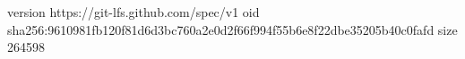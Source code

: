 version https://git-lfs.github.com/spec/v1
oid sha256:9610981fb120f81d6d3bc760a2e0d2f66f994f55b6e8f22dbe35205b40c0fafd
size 264598
